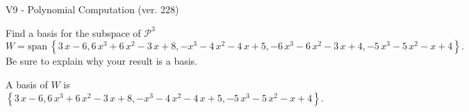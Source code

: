 \begin{exercise}
  \begin{exerciseTitle}V9 - Polynomial Computation (ver. 228)\end{exerciseTitle}
  \begin{exerciseStatement}
    Find a basis for the subspace of \(\mathcal{P}^3\) 
\[W=\mathrm{span}\ \left\{3 \, x - 6 , 6 \, x^{3} + 6 \, x^{2} - 3 \, x + 8 , -x^{3} - 4 \, x^{2} - 4 \, x + 5 , -6 \, x^{3} - 6 \, x^{2} - 3 \, x + 4 , -5 \, x^{3} - 5 \, x^{2} - x + 4\right\}.\]
 Be sure to explain why your result is a basis.


  \end{exerciseStatement}
  \begin{exerciseAnswer}
   A basis of \(W\) is  \(\left\{3 \, x - 6 , 6 \, x^{3} + 6 \, x^{2} - 3 \, x + 8 , -x^{3} - 4 \, x^{2} - 4 \, x + 5 , -5 \, x^{3} - 5 \, x^{2} - x + 4\right\}\).
  


  \end{exerciseAnswer}
\end{exercise}